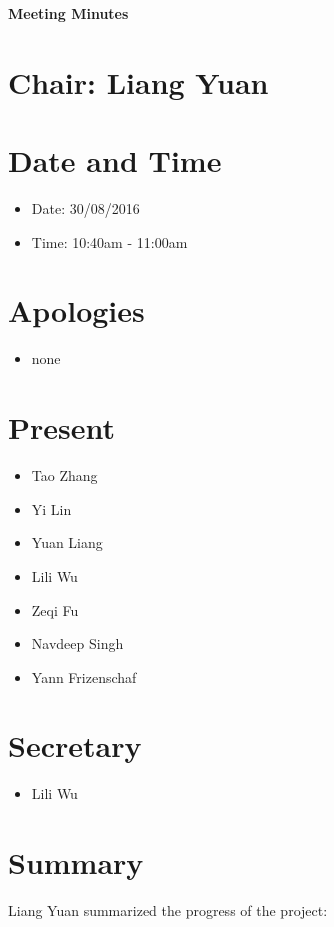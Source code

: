 \documentclass[11pt, a4paper]{article}
\begin{document}
\vspace*{15pt}
\begin{center}
\huge \bf Meeting Minutes
\end{center}

\section*{Chair: Liang Yuan}
\vspace*{10pt}

\section{Date and Time}
\begin{itemize}
\item Date: 30/08/2016
\item Time: 10:40am - 11:00am
\end{itemize}

\section{Apologies}
\begin{itemize}
\item none
\end{itemize}

\section{Present}
\begin{itemize}
\item Tao Zhang
\item Yi Lin
\item Yuan Liang
\item Lili Wu
\item Zeqi Fu
\item Navdeep Singh
\item Yann Frizenschaf
\end{itemize}

\section{Secretary}
\begin{itemize}
\item Lili Wu
\end{itemize}

\section{Summary }
Liang Yuan summarized the progress of the project:
\end{document}
